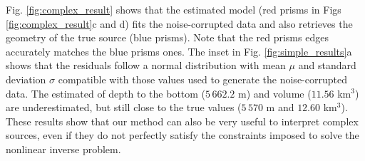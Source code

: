 Fig. \ref{fig:complex_result} shows that the estimated model (red prisms in Figs \ref{fig:complex_result}c and d) fits the noise-corrupted data and also retrieves the geometry of the true source (blue prisms). 
Note that the red prisms edges accurately matches the blue prisms ones. 
The inset in Fig. \ref{fig:simple_results}a shows that the residuals follow a normal 
distribution with mean $ \mu $ and standard deviation $ \sigma $ compatible with those 
values used to generate the noise-corrupted data. 
The estimated of depth to the bottom  ($ 5\,662.2 $ m) and volume ($ 11.56 $ km$^3 $) are underestimated, but still close to the true values ($ 5\,570 $ m and $ 12.60 $ km$^3 $). 
These results show that our method can also be very useful to interpret complex sources, even if they do not perfectly satisfy the constraints imposed to solve the nonlinear inverse problem.